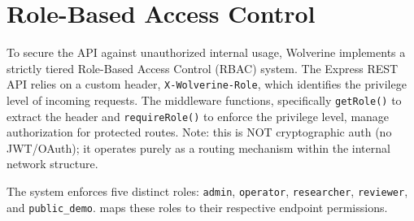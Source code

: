 \begin{table}[h]
\centering
{}
\caption{Backend Core Module Implementation Mapping}
\label{tab:backend-modules}
\end{table}

\section{Role-Based Access Control}
\label{sec:impl-rbac}
To secure the API against unauthorized internal usage, Wolverine implements a strictly tiered Role-Based Access Control (RBAC) system. The Express REST API relies on a custom header, \texttt{X-Wolverine-Role}, which identifies the privilege level of incoming requests. The middleware functions, specifically \texttt{getRole()} to extract the header and \texttt{requireRole()} to enforce the privilege level, manage authorization for protected routes. Note: this is NOT cryptographic auth (no JWT/OAuth); it operates purely as a routing mechanism within the internal network structure.

The system enforces five distinct roles: \texttt{admin}, \texttt{operator}, \texttt{researcher}, \texttt{reviewer}, and \texttt{public\_demo}.  maps these roles to their respective endpoint permissions.


